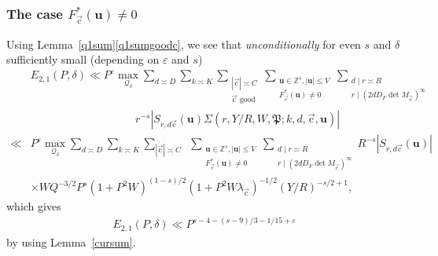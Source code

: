 \documentclass[letterpaper,11pt]{amsart}
\numberwithin{equation}{section}
\theoremstyle{definition}
\numberwithin{equation}{section}
\newcommand{\ZZ}{\mathbb{Z}}
\newcommand{\uu}{\mathbf{u}}
\newcommand{\uc}{{\vec{\mathrm{c}}}}
\newcommand{\ve}{\varepsilon}
\begin{document}
\subsubsection{The case $F_\uc^*(\uu)\not=0$}\label{sec:good-c-even-s-F-nonzero}
Using Lemma~\ref{q1sum}\eqref{q1sumgoodc}, we see that \emph{unconditionally} for even $s$ and $\delta$ sufficiently small (depending on $\ve$ and $s$)
\begin{align*}%
&E_{2,1}(P, \delta)\ll P^{\ve} \max_{ \mathcal Q_\delta}\sum_{d\asymp D}\sum_{k\asymp K}\sum_{\substack{|\uc|\asymp C\\ \uc \text{ good}}}\sum_{\substack{\uu\in\ZZ^s,  |\uu|\leq V\\ F_{\uc}^*(\uu)\not=0 }}\sum_{\substack{d\mid r\asymp R\\ r\mid (2dD_F\det M_\uc)^\infty}}\\& \hspace{4cm} r^{-s}|S_{r, d\uc}(\uu) \Sigma(r, Y/R, W, \mathfrak P;k,d, \uc, \uu)|\\
\ll & P^{\ve} \max_{\mathcal Q_\delta} \sum_{d\asymp D}\sum_{k\asymp K}\sum_{|\uc|\asymp C}\, \, \,\sum_{\substack{\uu\in\ZZ^s,  |\uu|\leq V\\ F_{\uc}^*(\uu)\not=0}}\sum_{\substack{d\mid r\asymp R\\ r\mid (2dD_F\det M_\uc)^\infty}}R^{-s}|S_{r, d\uc}(\uu)| \\
&\times WQ^{-3/2} P^{s} (1+P^2W)^{(1-s)/2}(1+P^2W\lambda_\uc)^{-1/2} (Y/R)^{-s/2+1},
\end{align*}
which gives 
\begin{align}\label{N221bounds}
    E_{2,1}(P, \delta)\ll P^{s-4-(s-9)/3-1/15+\ve}
\end{align} by
 using Lemma~\ref{cursum}. 
\end{document}
